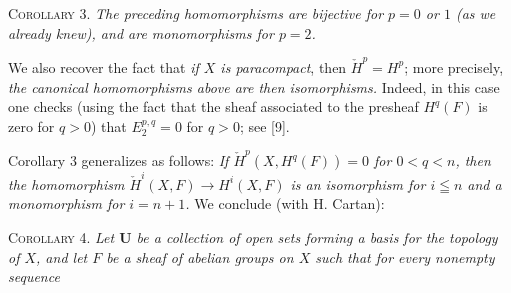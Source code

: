 \textsc{Corollary 3.} \textit{The preceding homomorphisms are
bijective for $p=0$ or $1$ \textup{(}as we already knew\textup{)}, and are monomorphisms for
$p=2$.}

We also recover the fact that \textit{if $X$ is paracompact}, then
$\check H^p=H^p$; more precisely, \textit{the canonical homomorphisms above
are then isomorphisms.} Indeed, in this case one checks (using the fact that
the sheaf associated to the presheaf $H^q(F)$ is zero for $q>0$) that
$E_2^{p,q}=0$ for $q>0$;
see [9].

Corollary 3 generalizes as follows: \textit{If
$\check H^p(X,H^q(F))=0$ for $0<q<n$, then the homomorphism
$\check H^i(X,F)\to H^i(X,F)$ is an isomorphism for $i\leqq n$ and
a monomorphism for $i=n+1$.} We conclude (with H. Cartan):

\textsc{Corollary 4.} \textit{Let $\mathbf U$ be a collection of
open sets forming a basis for the topology of $X$, and let $F$ be a sheaf of
abelian groups on $X$ such that for every nonempty sequence}

